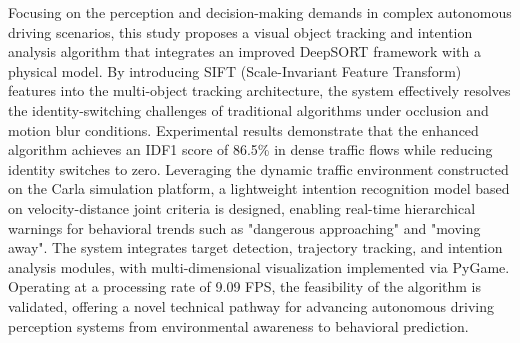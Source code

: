 \begin{abstracten}
	
Focusing on the perception and decision-making demands in complex autonomous driving scenarios, this study proposes a visual object tracking and intention analysis algorithm that integrates an improved DeepSORT framework with a physical model. By introducing SIFT (Scale-Invariant Feature Transform) features into the multi-object tracking architecture, the system effectively resolves the identity-switching challenges of traditional algorithms under occlusion and motion blur conditions. Experimental results demonstrate that the enhanced algorithm achieves an IDF1 score of 86.5\% in dense traffic flows while reducing identity switches to zero. Leveraging the dynamic traffic environment constructed on the Carla simulation platform, a lightweight intention recognition model based on velocity-distance joint criteria is designed, enabling real-time hierarchical warnings for behavioral trends such as "dangerous approaching" and "moving away". The system integrates target detection, trajectory tracking, and intention analysis modules, with multi-dimensional visualization implemented via PyGame. Operating at a processing rate of 9.09 FPS, the feasibility of the algorithm is validated, offering a novel technical pathway for advancing autonomous driving perception systems from environmental awareness to behavioral prediction.
	
\end{abstracten}
